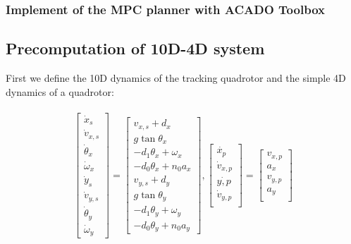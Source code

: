 \subsubsection{Implement of the MPC planner with ACADO Toolbox}
 

\subsection{Precomputation of 10D-4D system}
First we define the 10D dynamics of the tracking quadrotor and the simple 4D dynamics of a quadrotor:


\begin{equation}
\label{eq:Quad8D}
\begin{aligned}
\begin{array}{c}
\left[
\begin{array}{c}
\dot x_s\\
\dot v_{x,s}\\
\dot \theta_x\\
\dot\omega_x\\
\dot y_s\\
\dot v_{y,s}\\
\dot\theta_y\\
\dot\omega_y
\end{array}
\right]
=
\left[
\begin{array}{c}
v_{x,s} + d_x\\
g \tan \theta_x\\
-d_1 \theta_x + \omega_x\\
-d_0 \theta_x + n_0 a_x\\
v_{y,s} + d_y\\
g \tan \theta_y \\
-d_1 \theta_y + \omega_y\\
-d_0 \theta_y + n_0 a_y
\end{array}
\right],
\left[
\begin{array}{c}
\dot{x_p}\\
\dot v_{x,p}\\
\dot{y,p}\\
\dot v_{y,p}\\
\end{array}
\right] 
=
\left[
\begin{array}{c}
v_{x,p}\\
a_x\\
v_{y,p}\\
a_y\\
\end{array}
\right]
\end{array}\\
\end{aligned}
\end{equation}
